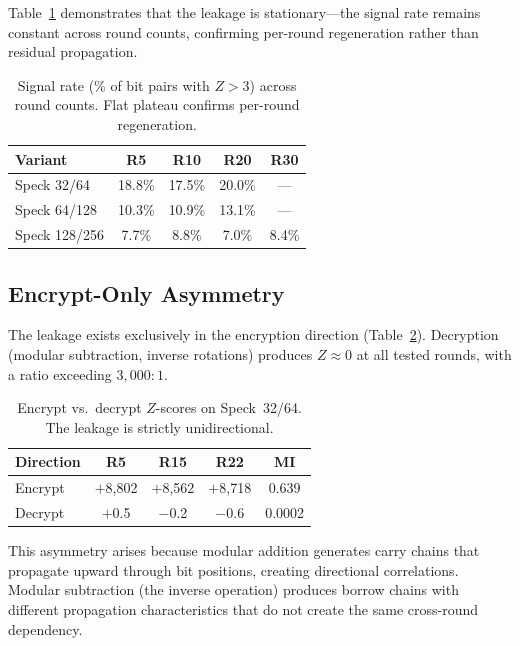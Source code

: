 \documentclass[conference,a4paper]{IEEEtran}
\begin{document}
Table~\ref{tab:stationarity} demonstrates that the leakage is stationary---the signal rate remains constant across round counts, confirming per-round regeneration rather than residual propagation.

\begin{table}[t]
\centering
\caption{Signal rate (\% of bit pairs with $Z > 3$) across round counts. Flat plateau confirms per-round regeneration.}
\label{tab:stationarity}
\begin{tabular}{@{}lcccc@{}}
\toprule
\textbf{Variant} & \textbf{R5} & \textbf{R10} & \textbf{R20} & \textbf{R30} \\
\midrule
Speck 32/64   & 18.8\% & 17.5\% & 20.0\% & --- \\
Speck 64/128  & 10.3\% & 10.9\% & 13.1\% & --- \\
Speck 128/256 &  7.7\% &  8.8\% &  7.0\% & 8.4\% \\
\bottomrule
\end{tabular}
\end{table}

\subsection{Encrypt-Only Asymmetry}

The leakage exists exclusively in the encryption direction (Table~\ref{tab:asymmetry}). Decryption (modular subtraction, inverse rotations) produces $Z \approx 0$ at all tested rounds, with a ratio exceeding $3{,}000{:}1$.

\begin{table}[t]
\centering
\caption{Encrypt vs.\ decrypt $Z$-scores on Speck~32/64. The leakage is strictly unidirectional.}
\label{tab:asymmetry}
\begin{tabular}{@{}lcccc@{}}
\toprule
\textbf{Direction} & \textbf{R5} & \textbf{R15} & \textbf{R22} & \textbf{MI} \\
\midrule
Encrypt & $+$8,802 & $+$8,562 & $+$8,718 & 0.639 \\
Decrypt & $+$0.5 & $-$0.2 & $-$0.6 & 0.0002 \\
\bottomrule
\end{tabular}
\end{table}

This asymmetry arises because modular addition generates carry chains that propagate upward through bit positions, creating directional correlations. Modular subtraction (the inverse operation) produces borrow chains with different propagation characteristics that do not create the same cross-round dependency.
\end{document}
